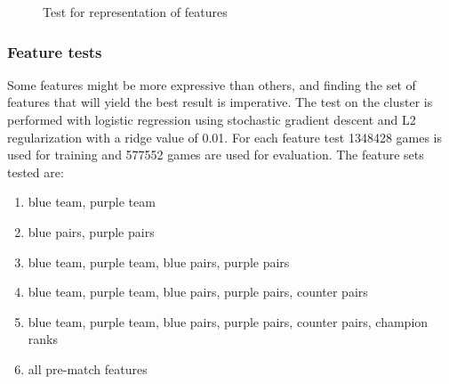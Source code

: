\begin{figure}[!htb]
  \caption{Test for representation of features}\label{fig:feat-rep}
\end{figure}

\subsubsection{Feature tests}\label{sec:feattest}
Some features might be more expressive than others, and finding the set of features that will yield the best result is imperative. The test on the cluster is performed with logistic regression using stochastic gradient descent and L2 regularization with a ridge value of 0.01. 
For each feature test 1348428 games is used for training and 577552 games are used for evaluation. 
The feature sets tested are:
\begin{enumerate}
\item blue team, purple team 
\item blue pairs, purple pairs
\item blue team, purple team, blue pairs, purple pairs
\item blue team, purple team, blue pairs, purple pairs, counter pairs
\item blue team, purple team, blue pairs, purple pairs, counter pairs, champion ranks
\item all pre-match features 
\end{enumerate}

